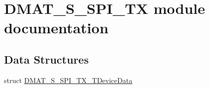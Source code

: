 \hypertarget{group___d_m_a_t___s___s_p_i___t_x__module}{\section{D\-M\-A\-T\-\_\-\-S\-\_\-\-S\-P\-I\-\_\-\-T\-X module documentation}
\label{group___d_m_a_t___s___s_p_i___t_x__module}
}
\subsection*{Data Structures}
\begin{DoxyCompactItemize}
\item 
struct \hyperlink{struct_d_m_a_t___s___s_p_i___t_x___t_device_data}{D\-M\-A\-T\-\_\-\-S\-\_\-\-S\-P\-I\-\_\-\-T\-X\-\_\-\-T\-Device\-Data}
\end{DoxyCompactItemize}
